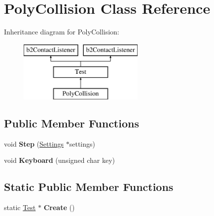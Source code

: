 \hypertarget{class_poly_collision}{\section{Poly\-Collision Class Reference}
\label{class_poly_collision}
}
Inheritance diagram for Poly\-Collision\-:\begin{figure}[H]
\begin{center}
\leavevmode
\includegraphics[height=3.000000cm]{class_poly_collision}
\end{center}
\end{figure}
\subsection*{Public Member Functions}
\begin{DoxyCompactItemize}
\item 
\hypertarget{class_poly_collision_a1a38008e84bfadc3dfbdba96c1941eac}{void {\bfseries Step} (\hyperlink{struct_settings}{Settings} $\ast$settings)}\label{class_poly_collision_a1a38008e84bfadc3dfbdba96c1941eac}

\item 
\hypertarget{class_poly_collision_ab08385f8dd563cb61fc5024e407c16a7}{void {\bfseries Keyboard} (unsigned char key)}\label{class_poly_collision_ab08385f8dd563cb61fc5024e407c16a7}

\end{DoxyCompactItemize}
\subsection*{Static Public Member Functions}
\begin{DoxyCompactItemize}
\item 
\hypertarget{class_poly_collision_a400637c605398e503acc77da8491d208}{static \hyperlink{class_test}{Test} $\ast$ {\bfseries Create} ()}\label{class_poly_collision_a400637c605398e503acc77da8491d208}

\end{DoxyCompactItemize}
